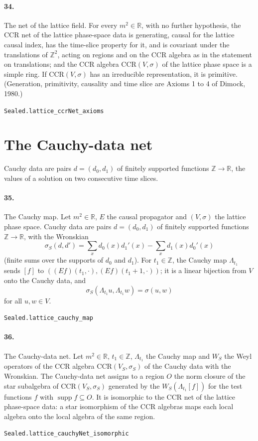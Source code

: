 \documentclass[11pt]{article}
\begin{document}
\paragraph{34.} The net of the lattice field. For every $m^2 \in \mathbb R$, with no further hypothesis, the CCR net of the lattice phase-space data is generating, causal for the lattice causal index, has the time-slice property for it, and is covariant under the translations of $\mathbb Z^2$, acting on regions and on the CCR algebra as in the statement on translations; and the CCR algebra $\mathrm{CCR}(V, \sigma)$ of the lattice phase space is a simple ring. If $\mathrm{CCR}(V, \sigma)$ has an irreducible representation, it is primitive. (Generation, primitivity, causality and time slice are Axioms 1 to 4 of Dimock, 1980.)\par{\footnotesize\texttt{Sealed.lattice\_ccrNet\_axioms}}

\section*{The Cauchy-data net}
Cauchy data are pairs $d = (d_0, d_1)$ of finitely supported functions $\mathbb Z \to \mathbb R$, the values of a solution on two consecutive time slices.

\paragraph{35.} The Cauchy map. Let $m^2 \in \mathbb R$, $E$ the causal propagator and $(V, \sigma)$ the lattice phase space. Cauchy data are pairs $d = (d_0, d_1)$ of finitely supported functions $\mathbb Z \to \mathbb R$, with the Wronskian \[\sigma_S(d, d') = \sum_x d_0(x) d_1'(x) - \sum_x d_1(x) d_0'(x)\] (finite sums over the supports of $d_0$ and $d_1$). For $t_1 \in \mathbb Z$, the Cauchy map $\Lambda_{t_1}$ sends $[f]$ to $((E f)(t_1, \cdot), (E f)(t_1 + 1, \cdot))$; it is a linear bijection from $V$ onto the Cauchy data, and \[\sigma_S(\Lambda_{t_1} u, \Lambda_{t_1} w) = \sigma(u, w)\] for all $u, w \in V$.\par{\footnotesize\texttt{Sealed.lattice\_cauchy\_map}}

\paragraph{36.} The Cauchy-data net. Let $m^2 \in \mathbb R$, $t_1 \in \mathbb Z$, $\Lambda_{t_1}$ the Cauchy map and $W_S$ the Weyl operators of the CCR algebra $\mathrm{CCR}(V_S, \sigma_S)$ of the Cauchy data with the Wronskian. The Cauchy-data net assigns to a region $O$ the norm closure of the star subalgebra of $\mathrm{CCR}(V_S, \sigma_S)$ generated by the $W_S(\Lambda_{t_1} [f])$ for the test functions $f$ with $\operatorname{supp} f \subseteq O$. It is isomorphic to the CCR net of the lattice phase-space data: a star isomorphism of the CCR algebras maps each local algebra onto the local algebra of the same region.\par{\footnotesize\texttt{Sealed.lattice\_cauchyNet\_isomorphic}}
\end{document}
